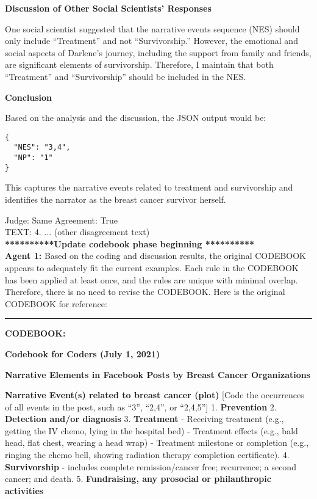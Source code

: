 \textbf{Discussion of Other Social Scientists'
Responses}

One social scientist suggested that the narrative events sequence (NES)
should only include ``Treatment'' and not ``Survivorship.'' However, the
emotional and social aspects of Darlene's journey, including the support
from family and friends, are significant elements of survivorship.
Therefore, I maintain that both ``Treatment'' and ``Survivorship''
should be included in the NES.

\textbf{Conclusion}

Based on the analysis and the discussion, the JSON output would be:

\begin{verbatim}
{
  "NES": "3,4",
  "NP": "1"
}
\end{verbatim}

This captures the narrative events related to treatment and survivorship
and identifies the narrator as the breast cancer survivor herself.

Judge: Same Agreement: True\\

TEXT: 4. ... (other disagreement text)\\

\textbf{**********Update codebook phase beginning **********}\\

\textbf{Agent 1:} Based on the coding and discussion results, the original
CODEBOOK appears to adequately fit the current examples. Each rule in
the CODEBOOK has been applied at least once, and the rules are unique
with minimal overlap. Therefore, there is no need to revise the
CODEBOOK. Here is the original CODEBOOK for reference:

\begin{center}\rule{0.5\linewidth}{0.5pt}\end{center}

\textbf{CODEBOOK:}

\textbf{Codebook for Coders (July 1, 2021)}

\textbf{Narrative Elements in Facebook Posts by Breast Cancer
Organizations}

\textbf{Narrative Event(s) related to breast cancer (plot)} {[}Code the
occurrences of all events in the post, such as ``3'', ``2,4'', or
``2,4,5''{]} 1. \textbf{Prevention} 2. \textbf{Detection and/or
diagnosis} 3. \textbf{Treatment} - Receiving treatment (e.g., getting
the IV chemo, lying in the hospital bed) - Treatment effects (e.g., bald
head, flat chest, wearing a head wrap) - Treatment milestone or
completion (e.g., ringing the chemo bell, showing radiation therapy
completion certificate). 4. \textbf{Survivorship} - includes complete
remission/cancer free; recurrence; a second cancer; and death. 5.
\textbf{Fundraising, any prosocial or philanthropic activities}

